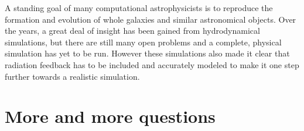 A standing goal of many computational astrophysicists is to reproduce the formation and evolution of whole galaxies and similar astronomical objects.
Over the years, a great deal of insight has been gained from hydrodynamical simulations, but there are still many open problems and a complete, physical simulation has yet to be run.
However these simulations also made it clear that radiation feedback has to be included and accurately modeled to make it one step further towards a realistic simulation.

\section{More and more questions}


